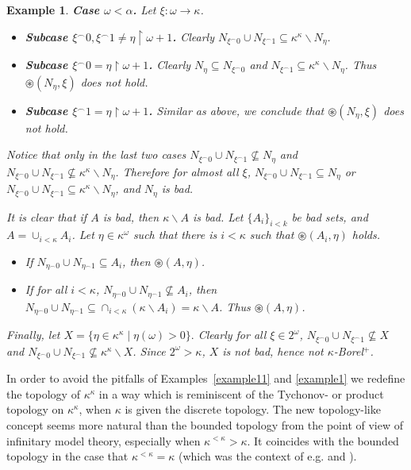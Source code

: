 \documentclass[12pt,a4paper]{amsart}
\newtheorem{example}[thm]{Example}
\theoremstyle{definition}
\theoremstyle{remark}
\renewcommand{\mid}{\mathrel{|}\allowbreak}
\renewcommand{\restriction}{\mathbin\upharpoonright}
\begin{document}
\begin{example}
        {\bf Case $\omega<\alpha$.} Let $\xi:\omega\rightarrow\kappa$.
        \begin{itemize}
            \item {\bf Subcase $\xi^\frown 0,\xi^\frown 1\neq\eta\restriction\omega+1$.} Clearly $N_{\xi^\frown 0}\cup N_{\xi^\frown 1}\subseteq \kappa^\kappa\backslash N_\eta$.
            \item {\bf Subcase $\xi^\frown 0=\eta\restriction\omega+1$.} Clearly $N_\eta\subseteq N_{\xi^\frown 0}$ and $N_{\xi^\frown 1}\subseteq \kappa^\kappa\backslash N_\eta$. Thus $\circledast(N_\eta,\xi)$ does not hold.
            \item {\bf Subcase $\xi^\frown 1=\eta\restriction\omega+1$.} Similar as above, we conclude that $\circledast(N_\eta,\xi)$ does not hold.
        \end{itemize}
        Notice that only in the last two cases $N_{\xi^\frown 0}\cup N_{\xi^\frown 1}\not\subseteq N_\eta$ and $N_{\xi^\frown 0}\cup N_{\xi^\frown 1}\not\subseteq \kappa^\kappa\backslash N_\eta$. Therefore for almost all $\xi$, $N_{\xi^\frown 0}\cup N_{\xi^\frown 1}\subseteq N_\eta$ or $N_{\xi^\frown 0}\cup N_{\xi^\frown 1}\subseteq \kappa^\kappa\backslash N_\eta$, and $N_\eta$ is bad.
    
    It is clear that if $A$ is bad, then $\kappa\backslash A$ is bad. Let $\{A_i\}_{i<k}$ be bad sets, and $A=\cup_{i<\kappa}A_i$. Let $\eta\in \kappa^\omega$ such that there is $i<\kappa$ such that $\circledast(A_i,\eta)$ holds.
    \begin{itemize}
        \item If $N_{\eta^\frown 0}\cup N_{\eta^\frown 1}\subseteq A_i$, then 
        $\circledast(A,\eta)$.
        \item If for all $i<\kappa$, $N_{\eta^\frown 0}\cup N_{\eta^\frown 1}\not\subseteq A_i$, then $N_{\eta^\frown 0}\cup N_{\eta^\frown 1}\subseteq \cap_{i<\kappa}(\kappa\backslash A_i)=\kappa\backslash A$. Thus $\circledast(A,\eta)$.
    \end{itemize}
    
Finally, let $X=\{\eta\in\kappa^\kappa\mid 
\eta(\omega)>0\}.$ 
Clearly for all $\xi\in 2^\omega$, $N_{\xi^\frown 0}\cup N_{\xi^\frown 1}\not\subseteq X$ and $N_{\xi^\frown 0}\cup N_{\xi^\frown 1}\not\subseteq \kappa^\kappa\backslash X$. Since $2^\omega>\kappa$, $X$ is not bad, hence not $\kappa$-Borel\hspace{2pt}$^+$.
\end{example}

In order to avoid the pitfalls of Examples~\ref{example11} and \ref{example1} we redefine the topology of $\kappa^\kappa$  in a way which is reminiscent of the Tychonov- or product topology on $\kappa^\kappa$, when $\kappa$ is given the discrete topology. The new topology-like concept seems more natural than the bounded topology from the point of view of infinitary model theory, especially when  $\kappa^{<\kappa}>\kappa$. It coincides with the bounded topology in the case that 
$\kappa^{<\kappa}=\kappa$ (which was the context of e.g. \cite{MR3235820} and \cite{MR1242054}).
\end{document}

